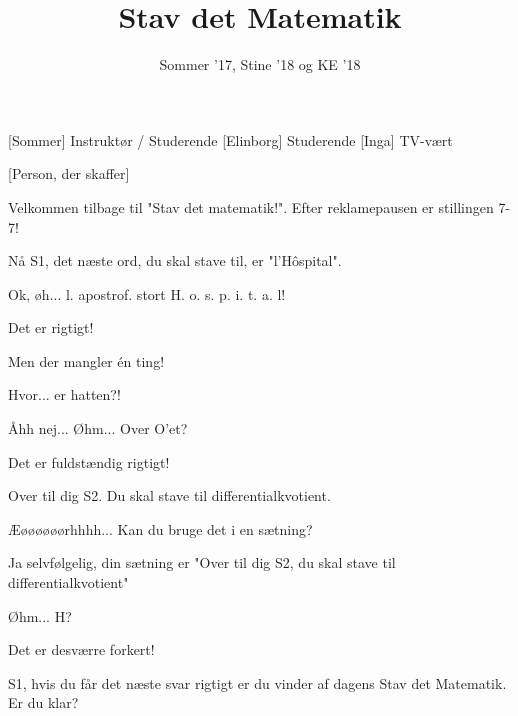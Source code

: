 \documentclass[a4paper,11pt]{article}
\title{Stav det Matematik}
\author{Sommer '17, Stine '18 og KE '18}
\begin{document}
\maketitle

\begin{roles}
[Sommer] Instruktør / Studerende
[Elinborg] Studerende
[Inga] TV-vært
\end{roles}

\begin{props}
[Person, der skaffer]
\end{props}


\begin{sketch}


 Velkommen tilbage til "Stav det matematik!". Efter reklamepausen er stillingen 7-7!


 Nå S1, det næste ord, du skal stave til, er "l'Hôspital".
 
 Ok, øh... l. apostrof. stort H. o. s. p. i. t. a. l!

 Det er rigtigt!


 Men der mangler én ting!


 Hvor... er hatten?!

 Åhh nej... Øhm... Over O'et?

  Det er fuldstændig rigtigt!

 Over til dig S2.  Du skal stave til differentialkvotient.

 Æøøøøøørhhhh... Kan du bruge det i en sætning?

 Ja selvfølgelig, din sætning er "Over til dig S2, du skal stave til differentialkvotient"

 Øhm... H?

  Det er desværre forkert!


 S1, hvis du får det næste svar rigtigt er du vinder af dagens Stav det Matematik. Er du klar?


\end{sketch}
\end{document}
